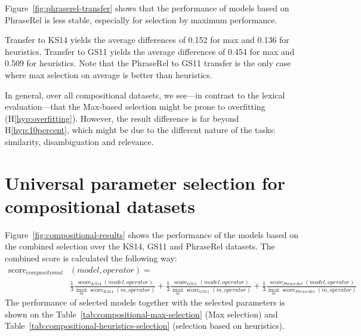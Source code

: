 

Figure~\ref{fig:phraserel-transfer} shows that the performance of models based on PhraseRel is less stable, especially for selection by maximum performance.

Transfer to KS14 yields the average differences of 0.152 for max and 0.136 for heuristics. Transfer to GS11 yields the average differences of 0.454 for max and 0.509 for heuristics. Note that the PhraseRel to GS11 transfer is the only case where max selection on average is better than heuristics.

In general, over all compositional datasets, we see---in contrast to the lexical evaluation---that the Max-based selection might be prone to overfitting (H\ref{hyp:overfitting}). However, the result difference is far beyond H\ref{hyp:10percent}, which might be due to the different nature of the tasks: similarity, disambiguation and relevance.

\section{Universal parameter selection for compositional datasets}
\label{sec:robust-param-comp-selecion}

Figure~\ref{fig:compositional-results} shows the performance of the models based on the combined selection over the KS14, GS11 and PhraseRel datasets. The combined score is calculated the following way:
%
\scriptsize
\begin{align*}
\operatorname{score}_\mathit{compositional}&(\mathit{model}, \mathit{operator}) =\\
&\frac{1}{3}%
\frac{\operatorname{score}_\mathit{KS14}(\mathit{model}, \mathit{operator})}%
{\max_m\operatorname{score}_\mathit{KS14}(m, \mathit{operator})}%
+%
\frac{1}{3}%
\frac{\operatorname{score}_\mathit{GS11}(\mathit{model}, \mathit{operator})}%
{\max_m\operatorname{score}_\mathit{GS11}(m, \mathit{operator})}%
+%
\frac{1}{3}%
\frac{\operatorname{score}_\mathit{PhraseRel}(\mathit{model, \mathit{operator}})}%
{\max_m\operatorname{score}_\mathit{PhraseRel}(m, \mathit{operator})}%
\end{align*}
\normalsize
The performance of selected models together with the selected parameters is shown on the Table~\ref{tab:compositional-max-selection} (Max selection) and Table~\ref{tab:compositional-heuristics-selection} (selection based on heuristics).



